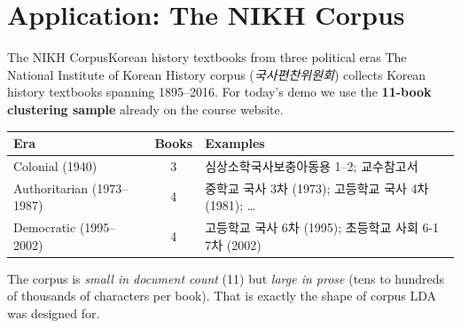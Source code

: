 \documentclass[aspectratio=169,10pt]{beamer}
\begin{document}
\section{Application: The NIKH Corpus}

\begin{frame}{The NIKH Corpus}{Korean history textbooks from three political eras}
  The National Institute of Korean History corpus (\emph{국사편찬위원회}) collects
  Korean history textbooks spanning 1895--2016. For today's demo we use the
  \textbf{11-book clustering sample} already on the course website.

  \vspace{0.5em}
  \begin{center}
    \small
    \begin{tabular}{@{}l c l@{}}
      \toprule
      \textbf{Era}                 & \textbf{Books} & \textbf{Examples}                                       \\
      \midrule
      Colonial (1940)               & 3              & 심상소학국사보충아동용 1--2; 교수참고서                   \\
      Authoritarian (1973--1987)    & 4              & 중학교 국사 3차 (1973); 고등학교 국사 4차 (1981); \ldots  \\
      Democratic (1995--2002)       & 4              & 고등학교 국사 6차 (1995); 초등학교 사회 6-1 7차 (2002)     \\
      \bottomrule
    \end{tabular}
  \end{center}

  \vspace{0.5em}
  The corpus is \emph{small in document count} (11) but \emph{large in prose}
  (tens to hundreds of thousands of characters per book). That is exactly the
  shape of corpus LDA was designed for.
\end{frame}
\end{document}
